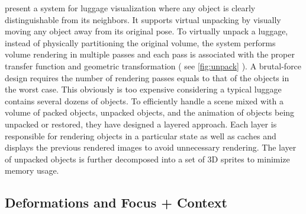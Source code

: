 \cite{Li:2012:LVV:2425296.2425325} present a system for luggage visualization where any object is
clearly distinguishable from its neighbors. It supports virtual unpacking
by visually moving any object away from its original pose. To virtually unpack a luggage, instead of physically partitioning the
original volume, the system performs volume rendering in multiple passes
and each pass is associated with the proper transfer function and geometric
transformation ( see \autoref{fig:unpack} ).  A brutal-force design requires the number
of rendering passes equals to that of the objects in the worst case.
This obviously is too expensive considering a typical luggage contains
several dozens of objects. To efficiently handle a scene mixed
with a volume of packed objects, unpacked objects, and the animation
of objects being unpacked or restored, they have designed a layered
approach. Each layer is responsible for rendering objects in a
particular state as well as caches and displays the previous rendered
images to avoid unnecessary rendering. The layer of unpacked objects
is further decomposed into a set of 3D sprites to minimize
memory usage.

\subsection{Deformations and Focus + Context}

